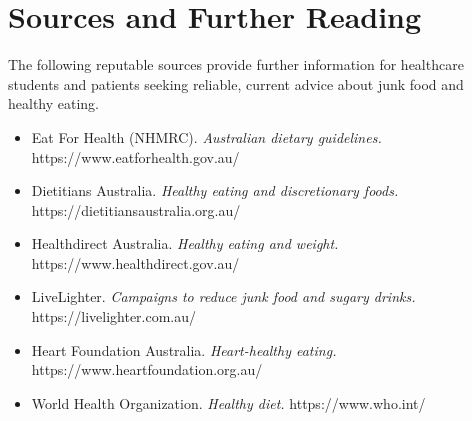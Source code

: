 \section*{Sources and Further Reading}
The following reputable sources provide further information for healthcare students and patients seeking reliable, current advice about junk food and healthy eating.
\begin{itemize}
    \item Eat For Health (NHMRC). \textit{Australian dietary guidelines.} https://www.eatforhealth.gov.au/
    \item Dietitians Australia. \textit{Healthy eating and discretionary foods.} https://dietitiansaustralia.org.au/
    \item Healthdirect Australia. \textit{Healthy eating and weight.} https://www.healthdirect.gov.au/
    \item LiveLighter. \textit{Campaigns to reduce junk food and sugary drinks.} https://livelighter.com.au/
    \item Heart Foundation Australia. \textit{Heart-healthy eating.} https://www.heartfoundation.org.au/
    \item World Health Organization. \textit{Healthy diet.} https://www.who.int/
\end{itemize}
